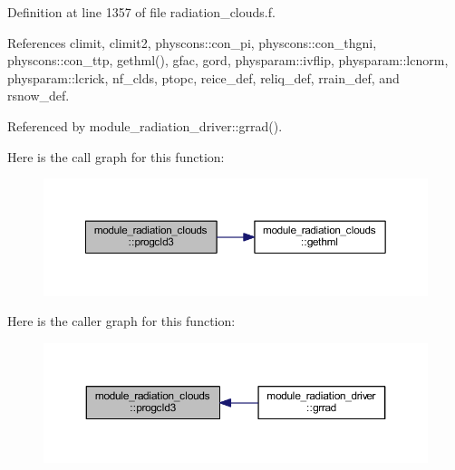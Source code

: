 Definition at line 1357 of file radiation\+\_\+clouds.\+f.



References climit, climit2, physcons\+::con\+\_\+pi, physcons\+::con\+\_\+thgni, physcons\+::con\+\_\+ttp, gethml(), gfac, gord, physparam\+::ivflip, physparam\+::lcnorm, physparam\+::lcrick, nf\+\_\+clds, ptopc, reice\+\_\+def, reliq\+\_\+def, rrain\+\_\+def, and rsnow\+\_\+def.



Referenced by module\+\_\+radiation\+\_\+driver\+::grrad().



Here is the call graph for this function\+:
\nopagebreak
\begin{figure}[H]
\begin{center}
\leavevmode
\includegraphics[width=350pt]{namespacemodule__radiation__clouds_a1953118ed22c3b6f8d94ef231b47a08b_cgraph}
\end{center}
\end{figure}




Here is the caller graph for this function\+:
\nopagebreak
\begin{figure}[H]
\begin{center}
\leavevmode
\includegraphics[width=350pt]{namespacemodule__radiation__clouds_a1953118ed22c3b6f8d94ef231b47a08b_icgraph}
\end{center}
\end{figure}


